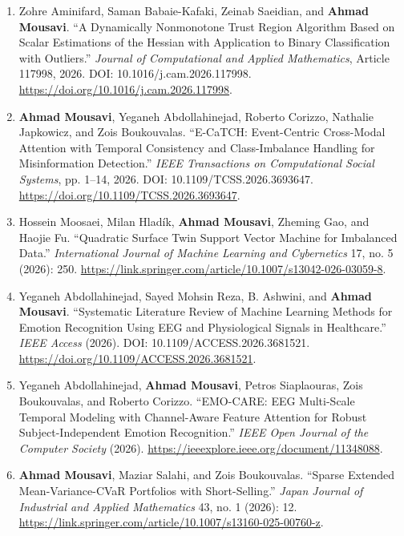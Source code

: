 \documentclass[letterpaper,11pt]{article}
\newcommand{\resheading}[1]{\par\vspace{0.6em}\noindent{\large\textbf{#1}}\par\vspace{0.25em}}
\begin{document}
\resheading{\LARGE{Publications}}
\resheading{\large{Journal Articles}}

\begin{enumerate}

\item[17.] Zohre Aminifard, Saman Babaie-Kafaki, Zeinab Saeidian, and \textbf{Ahmad Mousavi}. ``A Dynamically Nonmonotone Trust Region Algorithm Based on Scalar Estimations of the Hessian with Application to Binary Classification with Outliers.'' \textit{Journal of Computational and Applied Mathematics}, Article 117998, 2026. DOI: 10.1016/j.cam.2026.117998. \url{https://doi.org/10.1016/j.cam.2026.117998}.

\item[16.] \textbf{Ahmad Mousavi}, Yeganeh Abdollahinejad, Roberto Corizzo, Nathalie Japkowicz, and Zois Boukouvalas. ``E-CaTCH: Event-Centric Cross-Modal Attention with Temporal Consistency and Class-Imbalance Handling for Misinformation Detection.'' \textit{IEEE Transactions on Computational Social Systems}, pp. 1--14, 2026. DOI: 10.1109/TCSS.2026.3693647. \url{https://doi.org/10.1109/TCSS.2026.3693647}.

\item[15.] Hossein Moosaei, Milan Hladík, \textbf{Ahmad Mousavi}, Zheming Gao, and Haojie Fu. ``Quadratic Surface Twin Support Vector Machine for Imbalanced Data.'' \textit{International Journal of Machine Learning and Cybernetics} 17, no. 5 (2026): 250. \url{https://link.springer.com/article/10.1007/s13042-026-03059-8}.

\item[14.] Yeganeh Abdollahinejad, Sayed Mohsin Reza, B. Ashwini, and \textbf{Ahmad Mousavi}. ``Systematic Literature Review of Machine Learning Methods for Emotion Recognition Using EEG and Physiological Signals in Healthcare.'' \textit{IEEE Access} (2026). DOI: 10.1109/ACCESS.2026.3681521. \url{https://doi.org/10.1109/ACCESS.2026.3681521}.

\item[13.] Yeganeh Abdollahinejad, \textbf{Ahmad Mousavi}, Petros Siaplaouras, Zois Boukouvalas, and Roberto Corizzo. ``EMO-CARE: EEG Multi-Scale Temporal Modeling with Channel-Aware Feature Attention for Robust Subject-Independent Emotion Recognition.'' \textit{IEEE Open Journal of the Computer Society} (2026). \url{https://ieeexplore.ieee.org/document/11348088}.

\item[12.] \textbf{Ahmad Mousavi}, Maziar Salahi, and Zois Boukouvalas. ``Sparse Extended Mean-Variance-CVaR Portfolios with Short-Selling.'' \textit{Japan Journal of Industrial and Applied Mathematics} 43, no. 1 (2026): 12. \url{https://link.springer.com/article/10.1007/s13160-025-00760-z}.


\end{enumerate}
\end{document}

